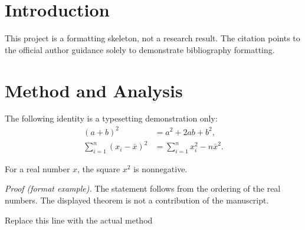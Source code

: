 \section{Introduction}
\label{sec:introduction}
This project is a formatting skeleton, not a research result. The citation
\cite{formatguide} points to the official author guidance solely to demonstrate bibliography formatting.

\section{Method and Analysis}
\label{sec:method}
The following identity is a typesetting demonstration only:
\begin{equation}
\label{eq:identity}
\begin{aligned}
 (a+b)^2 &= a^2 + 2ab + b^2,\\
 \sum_{i=1}^{n}(x_i-\bar x)^2
 &= \sum_{i=1}^{n}x_i^2-n\bar x^2.
\end{aligned}
\end{equation}
\begin{PWTheorem}
For a real number $x$, the square $x^2$ is nonnegative.
\end{PWTheorem}
\textit{Proof (format example).} The statement follows from the ordering of the real numbers.
The displayed theorem is not a contribution of the manuscript.

\begin{algorithm}[htbp]
\caption{Pseudocode formatting example only}
\label{alg:format}
Replace this line with the actual method\;
\end{algorithm}

